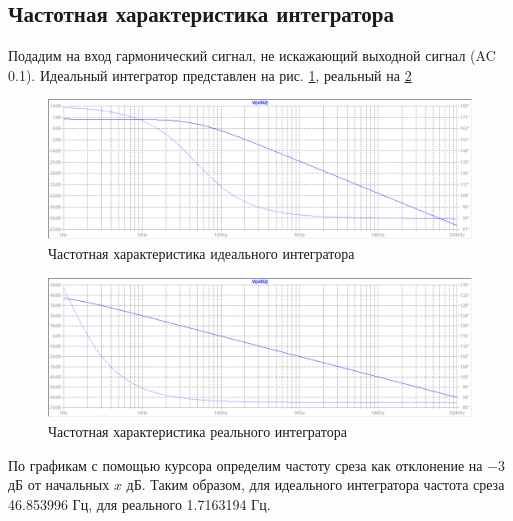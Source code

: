 \documentclass[a4paper, 12pt]{article}
\begin{document}
    \subsection{Частотная характеристика интегратора}
    Подадим на вход гармонический сигнал, не искажающий выходной сигнал (AC 0.1). Идеальный
    интегратор представлен на рис. \ref{fig:3task_ideal_int}, реальный на \ref{fig:3task_real_int}
    \begin{figure}[H]
        \centering
        \includegraphics[scale=0.46]{3task_ideal_int.png}
        \captionsetup{skip=0pt}
        \caption{Частотная характеристика идеального интегратора}
        \label{fig:3task_ideal_int}
    \end{figure}
    \begin{figure}[H]
        \centering
        \includegraphics[scale=0.46]{3task_real_int.png}
        \captionsetup{skip=0pt}
        \caption{Частотная характеристика реального интегратора}
        \label{fig:3task_real_int}
    \end{figure}
    \noindent По графикам с помощью курсора определим частоту среза как отклонение на $-3$ дБ от начальных $x$ дБ.
    Таким образом, для идеального интегратора частота среза 46.853996 Гц, для реального 1.7163194 Гц.
\end{document}
